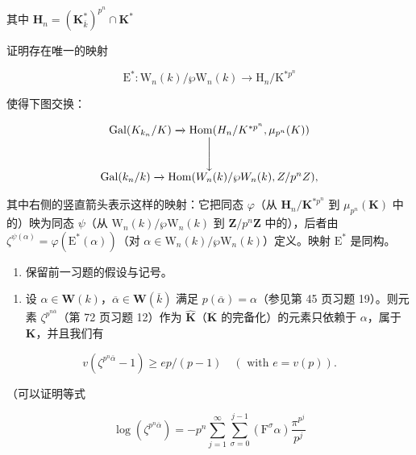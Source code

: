 \(\text{其中 }\mathbf{H}_n = (\mathbf{K}_{\overline{k}}^*)^{p^n}\cap \mathbf{K}^*\)

证明存在唯一的映射

\[
\mathrm{E} ^ {*}: \mathrm{W} _ {n} (k) / \wp \mathrm{W} _ {n} (k) \rightarrow \mathrm{H} _ {n} / \mathrm{K} ^ {* p ^ {n}}
\]

使得下图交换：

\[
\begin{array}{c} \operatorname{Gal} (K _ {k _ {n}} / K) \xrightarrow {} \operatorname{Hom} (H _ {n} / K ^ {* p ^ {n}}, \mu_ {p ^ {n}} (K)) \\ \Bigg \downarrow \\ \operatorname{Gal} (k _ {n} / k) \xrightarrow {} \operatorname{Hom} (W _ {n} (k) / \wp W _ {n} (k), Z / p ^ {n} Z), \end{array}
\]

其中右侧的竖直箭头表示这样的映射：它把同态 \(\varphi\)（从 \(\mathbf{H}_n / \mathbf{K}^{*p^n}\) 到 \(\mu_{p^n}(\mathbf{K})\) 中的）映为同态 \(\psi\)（从 \(\mathrm{W}_n(k) / \wp\mathrm{W}_n(k)\) 到 \(\mathbf{Z} / p^n\mathbf{Z}\) 中的），后者由 \(\zeta^{\psi (\alpha)} = \varphi (\mathrm{E}^{*}(\alpha))\)（对 \(\alpha \in \mathrm{W}_n(k) / \wp\mathrm{W}_n(k)\)）定义。映射 \(\mathrm{E}^*\) 是同构。

\begin{enumerate}
\def\labelenumi{\arabic{enumi})}
\setcounter{enumi}{14}
\tightlist
\item
  保留前一习题的假设与记号。
\end{enumerate}

\begin{enumerate}
\def\labelenumi{\alph{enumi})}
\tightlist
\item
  设 \(\alpha \in \mathbf{W}(k)\)，\(\overline{\alpha} \in \mathbf{W}(\overline{k})\) 满足 \(p(\overline{\alpha}) = \alpha\)（参见第 45 页习题 19）。则元素 \(\zeta^{p^{n\overline{\alpha}}}\)（第 72 页习题 12）作为 \(\widehat{\mathbf{K}}\)（\(\overline{\mathbf{K}}\) 的完备化）的元素只依赖于 \(\alpha\)，属于 \(\mathbf{K}\)，并且我们有
\end{enumerate}

\[
v \left(\zeta^ {p ^ {n} \bar {\alpha}} - 1\right) \geqslant e p / (p - 1) \quad (\text { with } e = v (p)).
\]

（可以证明等式

\[
\log \left(\zeta^ {p ^ {n} \overline {{{\alpha}}}}\right) = - p ^ {n} \sum_ {j = 1} ^ {\infty} \sum_ {\sigma = 0} ^ {j - 1} \left(\mathrm{F} ^ {\sigma} \alpha\right) \frac {\pi^ {p ^ {j}}}{p ^ {j}}
\]

